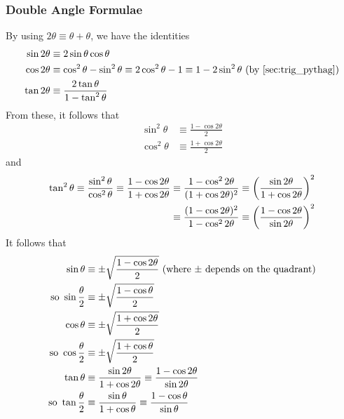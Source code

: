 \documentclass[fleqn,a4paper,11pt]{article}
\begin{document}
    \subsubsection{Double Angle Formulae} \label{sec:trig_double_angle}
    By using \(2\theta \equiv \theta + \theta\), we have the identities
    \begin{align}
    \sin 2\theta &\equiv
       2\sin \theta \cos \theta \\
    \cos 2\theta &\equiv
       \cos^2 \theta - \sin^2 \theta \equiv
       2\cos^2 \theta - 1 \equiv 1 - 2\sin^2 \theta
       \ \text{(by \ref{sec:trig_pythag})} \\
    \tan 2\theta &\equiv
        \frac{2\tan \theta}{1 - \tan^2 \theta}
    \end{align}
    From these, it follows that
    \begin{align}
    \sin^2 \theta &\equiv
        \frac{1 - \cos 2 \theta} 2 \\
    \cos^2 \theta &\equiv
        \frac{1 + \cos 2 \theta} 2
    \end{align}
    and
    \begin{align}
    \tan^2 \theta \equiv \frac{\sin^2 \theta}{\cos^2 \theta}
        \equiv \frac{1 - \cos 2 \theta}{1 + \cos 2 \theta}
        &\equiv \frac{1 - \cos^2 2 \theta}{(1 + \cos 2 \theta)^2}
        \equiv \pqty{\frac{\sin 2 \theta}{1 + \cos 2 \theta}}^2 \\
        &\equiv \frac{(1 - \cos 2 \theta)^2}{1 - \cos^2 2 \theta}
        \equiv \pqty{\frac{1 - \cos 2 \theta}{\sin 2 \theta}}^2
    \end{align}
    It follows that
    \begin{align}
    \sin \theta &\equiv
        \pm\sqrt{\frac{1 - \cos 2 \theta} 2}
     \ \pqty{\text{where \(\pm\) depends on the quadrant}} \\
    \text{so}\ \sin \frac \theta 2 &\equiv
        \pm\sqrt{\frac{1 - \cos \theta} 2} \nonumber \\
    \cos \theta &\equiv
        \pm\sqrt{\frac{1 + \cos 2 \theta} 2} \\
    \text{so}\ \cos \frac \theta 2 &\equiv
        \pm\sqrt{\frac{1 + \cos \theta} 2} \nonumber \\
    \tan \theta &\equiv
        \frac{\sin 2 \theta}{1 + \cos 2 \theta}
        \equiv \frac{1 - \cos 2 \theta}{\sin 2 \theta} \\
    \text{so}\ \tan \frac \theta 2 &\equiv
        \frac{\sin \theta}{1 + \cos \theta}
        \equiv \frac{1 - \cos \theta}{\sin \theta} \nonumber
    \end{align}
\end{document}
